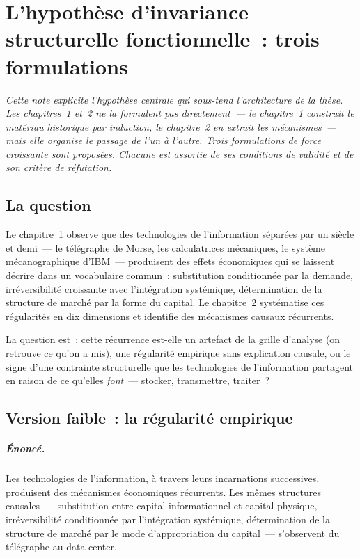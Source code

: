 
\chapter{L'hypothèse d'invariance structurelle fonctionnelle~: trois formulations}\label{ch:annexe-invariance}

\noindent\emph{Cette note explicite l'hypothèse centrale qui sous-tend l'architecture de la thèse. Les chapitres~1 et~2 ne la formulent pas directement~--- le chapitre~1 construit le matériau historique par induction, le chapitre~2 en extrait les mécanismes~--- mais elle organise le passage de l'un à l'autre. Trois formulations de force croissante sont proposées. Chacune est assortie de ses conditions de validité et de son critère de réfutation.}

\bigskip

\section{La question}

Le chapitre~1 observe que des technologies de l'information séparées par un siècle et demi~--- le télégraphe de Morse, les calculatrices mécaniques, le système mécanographique d'IBM~--- produisent des effets économiques qui se laissent décrire dans un vocabulaire commun~: substitution conditionnée par la demande, irréversibilité croissante avec l'intégration systémique, détermination de la structure de marché par la forme du capital. Le chapitre~2 systématise ces régularités en dix dimensions et identifie des mécanismes causaux récurrents.

La question est~: cette récurrence est-elle un artefact de la grille d'analyse (on retrouve ce qu'on a mis), une régularité empirique sans explication causale, ou le signe d'une contrainte structurelle que les technologies de l'information partagent en raison de ce qu'elles \emph{font}~--- stocker, transmettre, traiter~?

\section{Version faible~: la régularité empirique}

\paragraph{Énoncé.} Les technologies de l'information, à travers leurs incarnations successives, produisent des mécanismes économiques récurrents. Les mêmes structures causales~--- substitution entre capital informationnel et capital physique, irréversibilité conditionnée par l'intégration systémique, détermination de la structure de marché par le mode d'appropriation du capital~--- s'observent du télégraphe au data center.

